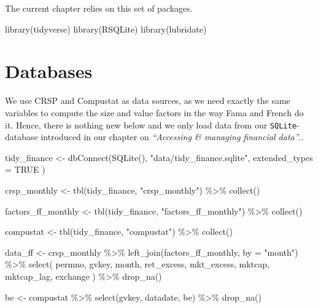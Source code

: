 \documentclass[
]{krantz}
\newenvironment{Shaded}{\begin{snugshade}}{\end{snugshade}}
\newcommand{\AttributeTok}[1]{\textcolor[rgb]{0.61,0.61,0.61}{#1}}
\newcommand{\ConstantTok}[1]{\textcolor[rgb]{0,0,0}{#1}}
\newcommand{\FunctionTok}[1]{\textcolor[rgb]{0,0,0}{#1}}
\newcommand{\NormalTok}[1]{#1}
\newcommand{\OtherTok}[1]{\textcolor[rgb]{0.37,0.37,0.37}{#1}}
\newcommand{\SpecialCharTok}[1]{\textcolor[rgb]{0,0,0}{#1}}
\newcommand{\StringTok}[1]{\textcolor[rgb]{0.5,0.5,0.5}{#1}}
\begin{document}
The current chapter relies on this set of packages.

\begin{Shaded}
\begin{Highlighting}[]
\FunctionTok{library}\NormalTok{(tidyverse)}
\FunctionTok{library}\NormalTok{(RSQLite)}
\FunctionTok{library}\NormalTok{(lubridate)}
\end{Highlighting}
\end{Shaded}

\hypertarget{databases}{%
\section{Databases}\label{databases}}

We use CRSP and Compustat as data sources, as we need exactly the same variables to compute the size and value factors in the way Fama and French do it. Hence, there is nothing new below and we only load data from our \texttt{SQLite}-database introduced in our chapter on \emph{``Accessing \& managing financial data''}..

\begin{Shaded}
\begin{Highlighting}[]
\NormalTok{tidy\_finance }\OtherTok{\textless{}{-}} \FunctionTok{dbConnect}\NormalTok{(}\FunctionTok{SQLite}\NormalTok{(), }\StringTok{"data/tidy\_finance.sqlite"}\NormalTok{,}
  \AttributeTok{extended\_types =} \ConstantTok{TRUE}
\NormalTok{)}

\NormalTok{crsp\_monthly }\OtherTok{\textless{}{-}} \FunctionTok{tbl}\NormalTok{(tidy\_finance, }\StringTok{"crsp\_monthly"}\NormalTok{) }\SpecialCharTok{\%\textgreater{}\%}
  \FunctionTok{collect}\NormalTok{()}

\NormalTok{factors\_ff\_monthly }\OtherTok{\textless{}{-}} \FunctionTok{tbl}\NormalTok{(tidy\_finance, }\StringTok{"factors\_ff\_monthly"}\NormalTok{) }\SpecialCharTok{\%\textgreater{}\%}
  \FunctionTok{collect}\NormalTok{()}

\NormalTok{compustat }\OtherTok{\textless{}{-}} \FunctionTok{tbl}\NormalTok{(tidy\_finance, }\StringTok{"compustat"}\NormalTok{) }\SpecialCharTok{\%\textgreater{}\%}
  \FunctionTok{collect}\NormalTok{()}

\NormalTok{data\_ff }\OtherTok{\textless{}{-}}\NormalTok{ crsp\_monthly }\SpecialCharTok{\%\textgreater{}\%}
  \FunctionTok{left\_join}\NormalTok{(factors\_ff\_monthly, }\AttributeTok{by =} \StringTok{"month"}\NormalTok{) }\SpecialCharTok{\%\textgreater{}\%}
  \FunctionTok{select}\NormalTok{(}
\NormalTok{    permno, gvkey, month, ret\_excess, mkt\_excess,}
\NormalTok{    mktcap, mktcap\_lag, exchange}
\NormalTok{  ) }\SpecialCharTok{\%\textgreater{}\%}
  \FunctionTok{drop\_na}\NormalTok{()}

\NormalTok{be }\OtherTok{\textless{}{-}}\NormalTok{ compustat }\SpecialCharTok{\%\textgreater{}\%}
  \FunctionTok{select}\NormalTok{(gvkey, datadate, be) }\SpecialCharTok{\%\textgreater{}\%}
  \FunctionTok{drop\_na}\NormalTok{()}
\end{Highlighting}
\end{Shaded}
\end{document}
